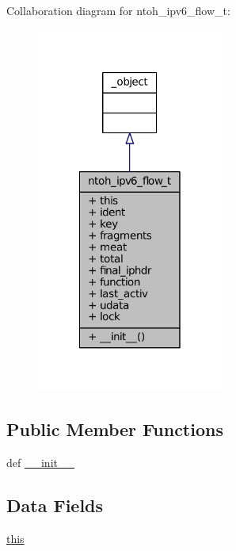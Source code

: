 Collaboration diagram for ntoh\-\_\-ipv6\-\_\-flow\-\_\-t\-:
\nopagebreak
\begin{figure}[H]
\begin{center}
\leavevmode
\includegraphics[width=174pt]{classlibntoh_1_1ntoh__ipv6__flow__t__coll__graph}
\end{center}
\end{figure}
\subsection*{Public Member Functions}
\begin{DoxyCompactItemize}
\item 
def \hyperlink{classlibntoh_1_1ntoh__ipv6__flow__t_ac775ee34451fdfa742b318538164070e}{\-\_\-\-\_\-init\-\_\-\-\_\-}
\end{DoxyCompactItemize}
\subsection*{Data Fields}
\begin{DoxyCompactItemize}
\item 
\hyperlink{classlibntoh_1_1ntoh__ipv6__flow__t_a05c09a5e9d53fa7adf0a7936038c2fa3}{this}
\end{DoxyCompactItemize}
